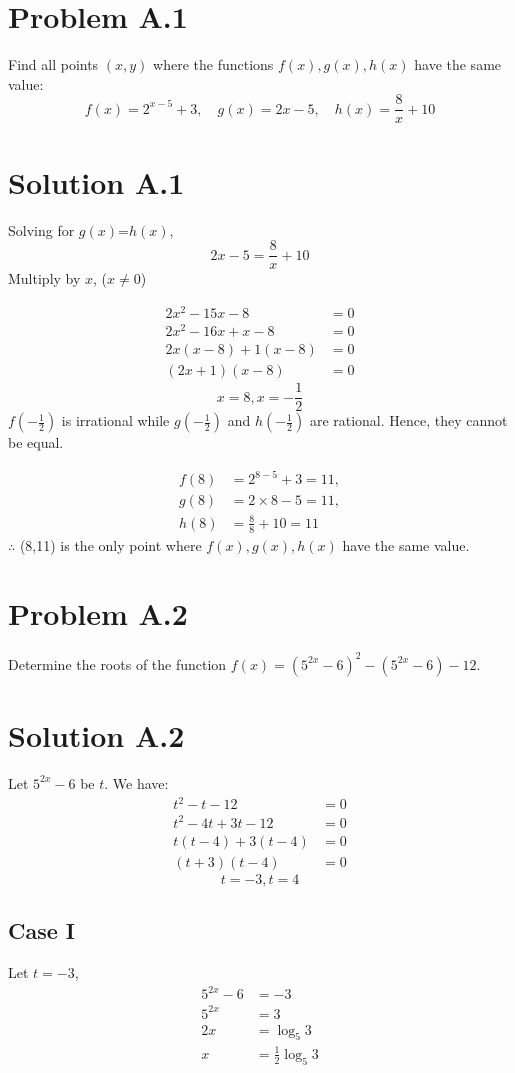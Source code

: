 \documentclass{article}
\begin{document}
\section*{Problem A.1}
Find all points $(x, y)$ where the functions $f(x), g(x), h(x)$ have the same value:
$$
f(x)=2^{x-5}+3, \quad g(x)=2 x-5, \quad h(x)=\frac{8}{x}+10
$$
\section*{Solution A.1}
Solving for $g(x)$=$h(x)$,
$$2x-5=\frac{8}{x}+10$$
Multiply by $x$, ($x\neq0$)

\begin{align*}
2x^2-15x-8&=0 \\
2x^2-16x+x-8&=0 \\
2x(x-8)+1(x-8)&=0\\
(2x+1)(x-8)&=0
\end{align*}
$$\boxed{x=8, x=-\frac{1}{2}}$$
$f\left(-\frac{1}{2}\right)$ is irrational while $g\left(-\frac{1}{2}\right)$ and $h\left(-\frac{1}{2}\right)$ are rational. Hence, they cannot be equal.

\begin{align*}
    f(8)&=2^{8-5}+3=11, \\
    g(8)&=2\times8-5=11, \\
    h(8)&=\frac{8}{8}+10=11
\end{align*}
$\therefore$ (8,11) is the only point where $f(x), g(x), h(x)$ have the same value.

\newpage
\section*{Problem A.2}
Determine the roots of the function $f(x)=\left(5^{2 x}-6\right)^{2}-\left(5^{2 x}-6\right)-12$.
\section*{Solution A.2}
Let $5^{2x}-6$ be $t$. We have:
\begin{align*}
    t^2-t-12&=0 \\
    t^2-4t+3t-12&=0 \\
    t(t-4)+3(t-4)&=0 \\
    (t+3)(t-4)&=0
\end{align*}
$$\boxed{t=-3, t=4}$$
\subsection*{Case I}
Let $t=-3$,
\begin{align*}
    5^{2x}-6&=-3 \\
    5^{2x}&=3 \\
    2x &= \log_5{3} \\
    x &= \frac{1}{2}\log_5{3}
\end{align*}
\end{document}
